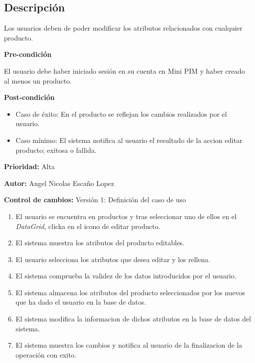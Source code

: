 {}

\subsection*{Descripción}
Los usuarios deben de poder modificar los atributos relacionados con cualquier producto.\par
\vspace{0.15cm}

\textbf{Pre-condición}\par
El usuario debe haber iniciado sesión en su cuenta en Mini PIM y haber creado al menos un producto.\par
\vspace{0.15cm}

\textbf{Post-condición}
\begin{itemize}
    \item Caso de éxito: En el producto se reflejan los cambios realizados por el usuario.
    \item Caso mínimo: El sistema notifica al usuario el resultado de la accion editar producto; exitosa o fallida.
\end{itemize}

\textbf{Prioridad: }
Alta
\vspace{0.15cm}

\textbf{Autor: }
Angel Nicolas Escaño Lopez\par
\vspace{0.15cm}

\textbf{Control de cambios: } Versión 1: Definición del caso de uso

\begin{enumerate}
    \item El usuario se encuentra en productos y tras seleccionar uno de ellos en el \textit{DataGrid}, clicka en el icono de editar producto.
    \item El sistema muestra los atributos del producto editables.
    \item El usuario selecciona los atributos que desea editar y los rellena.
    \item El sistema comprueba la validez de los datos introducidos por el usuario.
    \item El sistema almacena los atributos del producto seleccionados por los nuevos que ha dado el usuario en la base de datos.
    \item El sistema modifica la informacion de dichos atributos en la base de datos del sistema.
    \item El sistema muestra los cambios y notifica al usuario de la finalizacion de la operación con exito.
\end{enumerate}

